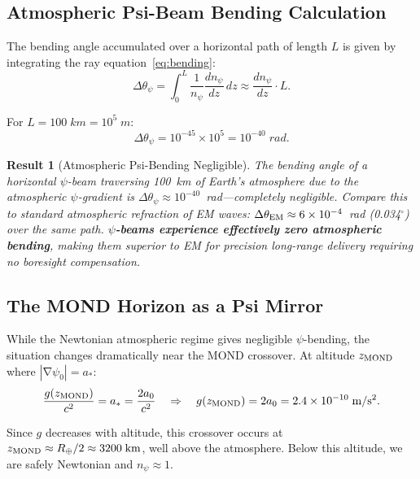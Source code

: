\documentclass[aps,prd,twocolumn,superscriptaddress]{revtex4-2}
\newcommand{\npsi}{n_\psi}
\DeclareMathOperator{\grad}{\nabla}
\newtheorem{result}{Result}
\begin{document}
\subsection{Atmospheric Psi-Beam Bending Calculation}

The bending angle accumulated over a horizontal path of length $L$
is given by integrating the ray equation~\eqref{eq:bending}:
\begin{equation}
\Delta\theta_\psi = \int_0^L \frac{1}{\npsi}\frac{d\npsi}{dz}\,dz
\approx \frac{d\npsi}{dz}\cdot L.
\label{eq:bending-angle}
\end{equation}

For $L = 100\;\si{km} = 10^5\;\si{m}$:
\begin{equation}
\Delta\theta_\psi = 10^{-45} \times 10^5 = 10^{-40}\;\si{rad}.
\label{eq:bending-num}
\end{equation}

\begin{result}[Atmospheric Psi-Bending Negligible]
The bending angle of a horizontal $\psi$-beam traversing 100~km of
Earth's atmosphere due to the atmospheric $\psi$-gradient is
$\Delta\theta_\psi \approx 10^{-40}$~rad---completely negligible.
Compare this to standard atmospheric refraction of EM waves:
$\Delta\theta_{\rm EM} \approx 6\times10^{-4}$~rad (0.034$^\circ$)
over the same path.  \textbf{$\psi$-beams experience effectively zero
atmospheric bending}, making them superior to EM for precision
long-range delivery requiring no boresight compensation.
\end{result}

\subsection{The MOND Horizon as a Psi Mirror}

While the Newtonian atmospheric regime gives negligible $\psi$-bending,
the situation changes dramatically near the MOND crossover.  At altitude
$z_{\rm MOND}$ where $|\grad\psi_0| = a_*$:
\begin{equation}
\frac{g(z_{\rm MOND})}{c^2} = a_* = \frac{2a_0}{c^2}
\quad\Rightarrow\quad g(z_{\rm MOND}) = 2a_0 = 2.4\times10^{-10}\;\si{m/s^2}.
\end{equation}

Since $g$ decreases with altitude, this crossover occurs at
$z_{\rm MOND} \approx R_\oplus/2 \approx 3200\;\si{km}$, well above the
atmosphere.  Below this altitude, we are safely Newtonian and $\npsi \approx 1$.
\end{document}
